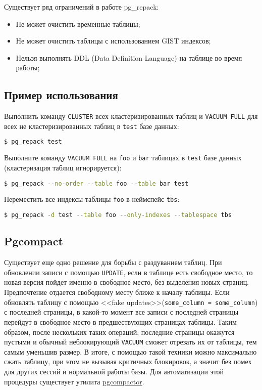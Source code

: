Существует ряд ограничений в работе pg\_repack:

\begin{itemize}
  \item Не может очистить временные таблицы;
  \item Не может очистить таблицы с использованием GIST индексов;
  \item Нельзя выполнять DDL (Data Definition Language) на таблице во время работы;
\end{itemize}


\subsection{Пример использования}

Выполнить команду \lstinline!CLUSTER! всех кластеризированных таблиц и \lstinline!VACUUM FULL! для всех не кластеризированных таблиц в \lstinline!test! базе данных:

\begin{lstlisting}[language=Bash,label=lst:pgrepack1]
$ pg_repack test
\end{lstlisting}

Выполните команду \lstinline!VACUUM FULL! на \lstinline!foo! и \lstinline!bar! таблицах в \lstinline!test! базе данных (кластеризация таблиц игнорируется):

\begin{lstlisting}[language=Bash,label=lst:pgrepack2]
$ pg_repack --no-order --table foo --table bar test
\end{lstlisting}

Переместить все индексы таблицы \lstinline!foo! в неймспейс \lstinline!tbs!:

\begin{lstlisting}[language=Bash,label=lst:pgrepack3]
$ pg_repack -d test --table foo --only-indexes --tablespace tbs
\end{lstlisting}


\subsection{Pgcompact}

Существует еще одно решение для борьбы с раздуванием таблиц. При обновлении записи с помощью \lstinline!UPDATE!, если в таблице есть свободное место, то новая версия пойдет именно в свободное место, без выделения новых страниц. Предпочтение отдается свободному месту ближе к началу таблицы. Если обновлять таблицу с помощью <<fake updates>>(\lstinline!some_column = some_column!) с последней страницы, в какой-то момент все записи с последней страницы перейдут в свободное место в предшествующих страницах таблицы. Таким образом, после нескольких таких операций, последние страницы окажутся пустыми и обычный неблокирующий \lstinline!VACUUM! сможет отрезать их от таблицы, тем самым уменьшив размер. В итоге, с помощью такой техники можно максимально сжать таблицу, при этом не вызывая критичных блокировок, а значит без помех для других сессий и нормальной работы базы. Для автоматизации этой процедуры существует утилита \href{https://github.com/grayhemp/pgtoolkit}{pgcompactor}.

